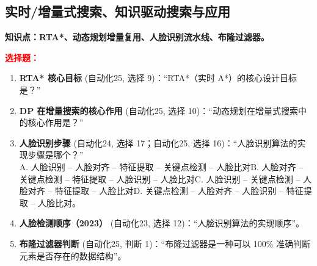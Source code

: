 ﻿\documentclass[../main.tex]{subfiles}
\begin{document}
\subsection{实时/增量式搜索、知识驱动搜索与应用}

\noindent\textbf{知识点：RTA*、动态规划增量复用、人脸识别流水线、布隆过滤器。}

\noindent\textbf{\textcolor{red}{选择题：}}
\begin{enumerate}[itemsep=0.45em, topsep=0.2em, leftmargin=1.5em]
    \item \textbf{RTA* 核心目标} \textcolor{autoclassgreen}{(自动化25, 选择 9)}：``RTA*（实时 A*）的核心设计目标是？''\\
     

    \item \textbf{DP 在增量搜索的核心作用} \textcolor{autoclassgreen}{(自动化25, 选择 10)}：``动态规划在增量式搜索中的核心作用是？''\\
     

    \item \textbf{人脸识别步骤} \textcolor{autoclassgreen}{(自动化24, 选择 17；自动化25, 选择 16)}：``人脸识别算法的实现步骤是哪个？''\\
    A. 人脸识别 – 人脸对齐 – 特征提取 – 关键点检测 – 人脸比对\quad B. 人脸对齐 – 关键点检测 – 特征提取 – 人脸识别 – 人脸比对\quad C. 人脸识别 – 关键点检测 – 人脸对齐 – 特征提取 – 人脸比对\quad D. 关键点检测 – 人脸对齐 – 人脸识别 – 特征提取 – 人脸比对。 

    \item \textbf{人脸检测顺序（2023）} \textcolor{autoclassgreen}{(自动化23, 选择 12)}：``人脸识别算法的实现顺序''。\\
     

    \item \textbf{布隆过滤器判断} \textcolor{autoclassgreen}{(自动化25, 判断 1)}：``布隆过滤器是一种可以 100\% 准确判断元素是否存在的数据结构''。 
\end{enumerate}
\end{document}
